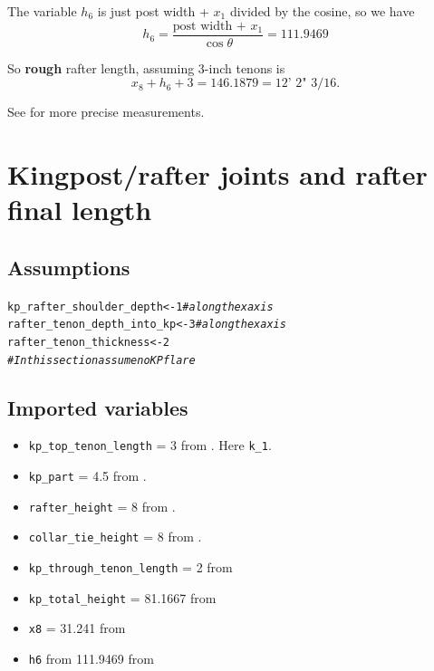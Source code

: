 \documentclass{article}\usepackage[]{graphicx}\usepackage[]{xcolor}
\makeatletter
\newcommand{\hlnum}[1]{\textcolor[rgb]{0.686,0.059,0.569}{#1}}%
\newcommand{\hlcom}[1]{\textcolor[rgb]{0.678,0.584,0.686}{\textit{#1}}}%
\newcommand{\hlstd}[1]{\textcolor[rgb]{0.345,0.345,0.345}{#1}}%
\newcommand{\hlkwb}[1]{\textcolor[rgb]{0.69,0.353,0.396}{#1}}%
\newenvironment{kframe}{%
 \def\at@end@of@kframe{}%
 \ifinner\ifhmode%
  \def\at@end@of@kframe{\end{minipage}}%
  \begin{minipage}{\columnwidth}%
 \fi\fi%
 \def\FrameCommand##1{\hskip\@totalleftmargin \hskip-\fboxsep
 \colorbox{shadecolor}{##1}\hskip-\fboxsep
     \hskip-\linewidth \hskip-\@totalleftmargin \hskip\columnwidth}%
 \MakeFramed {\advance\hsize-\width
   \@totalleftmargin\z@ \linewidth\hsize
   \@setminipage}}%
 {\par\unskip\endMakeFramed%
 \at@end@of@kframe}
\newenvironment{knitrout}{}{} %
\makeatother
\begin{document}
The variable $h_6$ is just post width + $x_1$ divided by the cosine, so we have 
\[ h_6 = \frac{\text{post width + }x_1}{\cos\theta} = 111.9469 \]

So \textbf{rough} rafter length, assuming 3-inch tenons is 
\[ x_8 + h_6 + 3 = 146.1879 = \text{12' 2" 3/16}.\]

See  for more precise measurements.










\section{Kingpost/rafter joints and rafter final length}\label{kingpost-rafter-joints}

\subsection{Assumptions}  \label{kp-rafter-joints-assumptions}

\begin{knitrout}
\color{fgcolor}\begin{kframe}
\begin{alltt}
\hlstd{kp_rafter_shoulder_depth} \hlkwb{<-} \hlnum{1} \hlcom{# along the x axis}
\hlstd{rafter_tenon_depth_into_kp} \hlkwb{<-} \hlnum{3} \hlcom{# along the x axis}
\hlstd{rafter_tenon_thickness} \hlkwb{<-} \hlnum{2}
\hlcom{# In this section assume no KP flare}
\end{alltt}
\end{kframe}
\end{knitrout}



\subsection{Imported variables} \label{kp-rafter-joints-imported-variables}
\begin{itemize}
  \item \verb+kp_top_tenon_length+ = 3 from . Here \verb+k_1+.
  \item \verb+kp_part+ = 4.5 from .
  \item \verb+rafter_height+ = 8 from . 
  \item \verb+collar_tie_height+ = 8 from .
  \item \verb+kp_through_tenon_length+ = 2 from 
  \item \verb+kp_total_height+ = 81.1667 from 
  \item \verb+x8+ = 31.241 from 
  \item \verb+h6+ from 111.9469 from 
\end{itemize}
\end{document}
